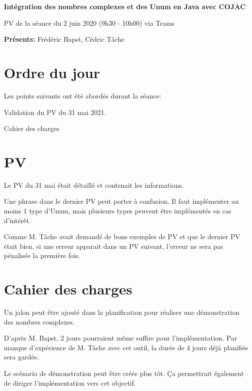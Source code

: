 \documentclass[11pt]{meetingmins}
\date{2 juin 2021}
\begin{document}
\begin {center} {
    \large \textbf {Intégration des nombres complexes et des Unum en Java avec COJAC}
}
\vspace {0.5ex}

PV de la séance du 2 juin 2020 (9h30 - 10h00) via Teams
\end {center} \vspace {1.5em}

\noindent
\textbf{Présents:} Frédéric Bapst, Cédric Tâche

\section{Ordre du jour}
Les points suivants ont été abordés durant la séance:
\begin{hiddenitems}
    \item Validation du PV du 31 mai 2021.
    \item Cahier des charges
\end{hiddenitems}

\section{PV}
\begin{hiddenitems}
    \item Le PV du 31 mai était détaillé et contenait les informations.
    \item Une phrase dans le dernier PV peut porter à confusion. Il faut implémenter au moins 1 type d'Unum, mais plusieurs types peuvent être implémentés en cas d'intérêt.
    \item Comme M. Tâche avait demandé de bons exemples de PV et que le dernier PV était bien, si une erreur apparait dans un PV suivant, l'erreur ne sera pas pénalisée la première fois.
\end{hiddenitems}

\section{Cahier des charges}
\begin{hiddenitems}
    \item Un jalon peut être ajouté dans la planification pour réaliser une démonstration des nombres complexes.
    \item D'après M. Bapst, 2 jours pourraient même suffire pour l'implémentation. Par manque d'expérience de M. Tâche avec cet outil, la durée de 4 jours déjà planifiée sera gardée.
    \item Le scénario de démonstration peut être créée plus tôt. Ça permettrait également de diriger l'implémentation vers cet objectif.
\end{hiddenitems}
\end{document}
